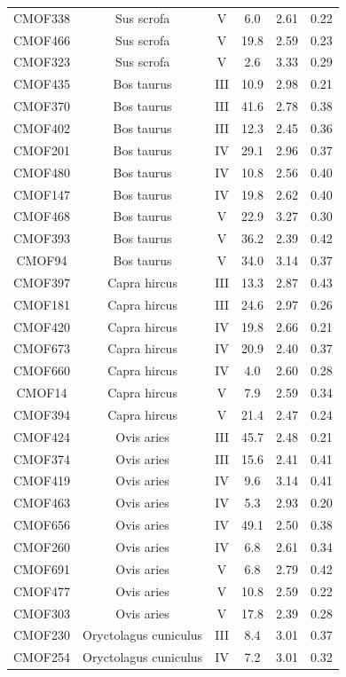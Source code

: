 \documentclass[3p]{elsarticle} %
\begin{document}
\begin{longtable}[t]{cccccc}
CMOF338 & Sus scrofa & V & 6.0 & 2.61 & 0.22\\
CMOF466 & Sus scrofa & V & 19.8 & 2.59 & 0.23\\
CMOF323 & Sus scrofa & V & 2.6 & 3.33 & 0.29\\
CMOF435 & Bos taurus & III & 10.9 & 2.98 & 0.21\\
CMOF370 & Bos taurus & III & 41.6 & 2.78 & 0.38\\
CMOF402 & Bos taurus & III & 12.3 & 2.45 & 0.36\\
CMOF201 & Bos taurus & IV & 29.1 & 2.96 & 0.37\\
CMOF480 & Bos taurus & IV & 10.8 & 2.56 & 0.40\\
CMOF147 & Bos taurus & IV & 19.8 & 2.62 & 0.40\\
CMOF468 & Bos taurus & V & 22.9 & 3.27 & 0.30\\
CMOF393 & Bos taurus & V & 36.2 & 2.39 & 0.42\\
CMOF94 & Bos taurus & V & 34.0 & 3.14 & 0.37\\
CMOF397 & Capra hircus & III & 13.3 & 2.87 & 0.43\\
CMOF181 & Capra hircus & III & 24.6 & 2.97 & 0.26\\
CMOF420 & Capra hircus & IV & 19.8 & 2.66 & 0.21\\
CMOF673 & Capra hircus & IV & 20.9 & 2.40 & 0.37\\
CMOF660 & Capra hircus & IV & 4.0 & 2.60 & 0.28\\
CMOF14 & Capra hircus & V & 7.9 & 2.59 & 0.34\\
CMOF394 & Capra hircus & V & 21.4 & 2.47 & 0.24\\
CMOF424 & Ovis aries & III & 45.7 & 2.48 & 0.21\\
CMOF374 & Ovis aries & III & 15.6 & 2.41 & 0.41\\
CMOF419 & Ovis aries & IV & 9.6 & 3.14 & 0.41\\
CMOF463 & Ovis aries & IV & 5.3 & 2.93 & 0.20\\
CMOF656 & Ovis aries & IV & 49.1 & 2.50 & 0.38\\
CMOF260 & Ovis aries & IV & 6.8 & 2.61 & 0.34\\
CMOF691 & Ovis aries & V & 6.8 & 2.79 & 0.42\\
CMOF477 & Ovis aries & V & 10.8 & 2.59 & 0.22\\
CMOF303 & Ovis aries & V & 17.8 & 2.39 & 0.28\\
CMOF230 & Oryctolagus cuniculus & III & 8.4 & 3.01 & 0.37\\
CMOF254 & Oryctolagus cuniculus & IV & 7.2 & 3.01 & 0.32\\

\end{longtable}
\end{document}
